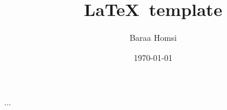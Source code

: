 \documentclass[a4paper,twocolumn]{article}
\title{\LaTeX\ template}
\date{1970-01-01}
\author{Baraa Homsi}
\begin{document}
\maketitle

...

\printbibliography
\end{document}
